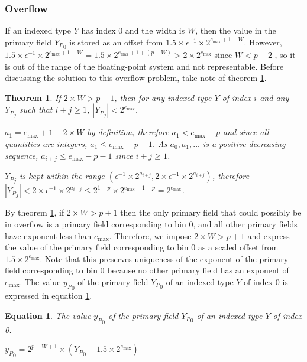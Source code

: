 \documentclass[12pt]{article}
\providecommand{\max}{\ensuremath{\text{max}}}
\theoremstyle{plain}
\newtheorem{thm}{Theorem}[section]
\newtheorem{eq}{Equation}[section]
\begin{document}
    \subsubsection{Overflow}
      \label{sec:overflow}
      If an indexed type $Y$ has index 0 and the width is $W$, then the value in the primary field ${Y_P}_0$ is stored as an offset from $1.5\times\epsilon^{-1}\times2^{e_{\max} + 1 - W}$. However, $1.5\times\epsilon^{-1}\times2^{e_{\max} + 1 - W} = 1.5 \times 2^{e_{\max} + 1 + (p - W)} > 2 \times 2^{e_{\max}}$ since $W < p - 2$ \cite{repsum}, so it is out of the range of the floating-point system and not representable. Before discussing the solution to this overflow problem, take note of theorem \ref{thm:overflow}.
      \begin{thm}
        If $2\times W > p + 1$, then for any indexed type $Y$ of index $i$ and any ${Y_P}_j$ such that $i + j \geq 1$, $|{Y_P}_j| < 2^{e_{\max}}$.

        $a_1 = e_{\max} + 1 - 2\times W$ by definition, therefore $a_1 < e_{\max} - p$ and since all quantities are integers, $a_1 \leq e_{\max} - p - 1$. As $a_0, a_1, ...$ is a positive decreasing sequence, $a_{i + j} \leq e_{\max} - p - 1$ since $i + j \geq 1$.

        ${Y_P}_j$ is kept within the range $(\epsilon^{-1} \times 2^{a_{i + j}}, 2 \times \epsilon^{-1} \times 2^{a_{i + j}})$, therefore
        $|{Y_P}_j| < 2 \times \epsilon^{-1} \times 2^{a_{i + j}} \leq 2^{1 + p} \times 2^{e_{\max} - 1 - p} = 2^{e_{\max}}$.

        \label{thm:overflow}
      \end{thm}
      By theorem \ref{thm:overflow}, if $2\times W > p + 1$ then the only primary field that could possibly be in overflow is a primary field corresponding to bin 0, and all other primary fields have exponent less than $e_{\max}$. Therefore, we impose $2\times W > p + 1$ and express the value of the primary field corresponding to bin 0 as a scaled offset from $1.5\times2^{e_{\max}}$. Note that this preserves uniqueness of the exponent of the primary field corresponding to bin 0 because no other primary field has an exponent of $e_{\max}$. The value ${y_P}_0$ of the primary field ${Y_P}_0$ of an indexed type $Y$ of index 0 is expressed in equation \ref{eq:pri0}.
      \begin{eq} The value ${y_P}_0$ of the primary field ${Y_P}_0$ of an indexed type $Y$ of index 0.

        ${y_P}_0 = 2^{p - W + 1}\times({Y_P}_0 - 1.5\times2^{e_{\max}})$
        \label{eq:pri0}
      \end{eq}
\end{document}

